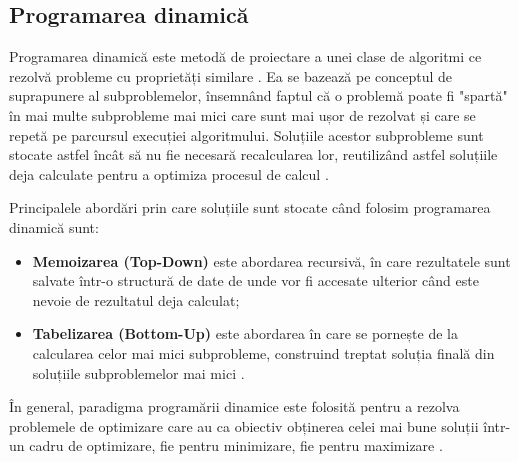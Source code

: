 \begin{sloppypar}
\subsection*{Programarea dinamică}
Programarea dinamică este metodă de proiectare a unei clase de algoritmi ce rezolvă probleme cu proprietăți similare \cite{Algorithm-Design}. Ea se bazează pe conceptul de suprapunere al subproblemelor, însemnând faptul că o problemă poate fi "spartă" în mai multe subprobleme mai mici care sunt mai ușor de rezolvat și care se repetă pe parcursul execuției algoritmului. 
Soluțiile acestor subprobleme sunt stocate astfel încât să nu fie necesară recalcularea lor, reutilizând astfel soluțiile deja calculate pentru a optimiza procesul de calcul \cite{DP-javatpoint}. \par 
Principalele abordări prin care soluțiile sunt stocate când folosim programarea dinamică sunt:
\begin{itemize}
     \item \textbf{Memoizarea (Top-Down)} este abordarea recursivă, în care rezultatele sunt salvate într-o structură de date de unde vor fi accesate ulterior când este nevoie de rezultatul deja calculat;
     \item \textbf{Tabelizarea (Bottom-Up)} este abordarea în care se pornește de la calcularea celor mai mici subprobleme, construind treptat soluția finală din soluțiile subproblemelor mai mici \cite{DP-GG}.
\end{itemize} \par
În general, paradigma programării dinamice este folosită pentru a rezolva problemele de optimizare care au ca obiectiv obținerea celei mai bune soluții într-un cadru de optimizare, fie pentru minimizare, fie pentru maximizare \cite{Algorithm-Design}. \par



\end{sloppypar}
